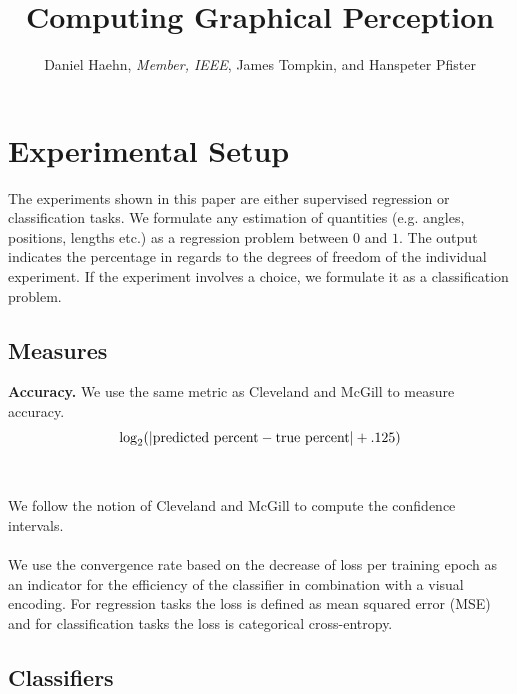 \documentclass[journal]{vgtc}                %
\title{Computing Graphical Perception}
\author{Daniel Haehn, \textit{Member, IEEE}, James Tompkin, and Hanspeter Pfister}
\begin{document}






\section{Experimental Setup}

The experiments shown in this paper are either supervised regression or classification tasks. We formulate any estimation of quantities (e.g. angles, positions, lengths etc.) as a regression problem between $0$ and $1$. The output indicates the percentage in regards to the degrees of freedom of the individual experiment. If the experiment involves a choice, we formulate it as a classification problem.

\subsection{Measures}

\textbf{Accuracy.} We use the same metric as Cleveland and McGill to measure accuracy.
\begin{equation}
	\log_2( | \textnormal{predicted percent} - \textnormal{true percent} | + .125)
\end{equation}
\\~\\
 We follow the notion of Cleveland and McGill to compute the confidence intervals.
\\~\\
 We use the convergence rate based on the decrease of loss per training epoch as an indicator for the efficiency of the classifier in combination with a visual encoding. For regression tasks the loss is defined as mean squared error (MSE) and for classification tasks the loss is categorical cross-entropy.

\subsection{Classifiers}
\end{document}

